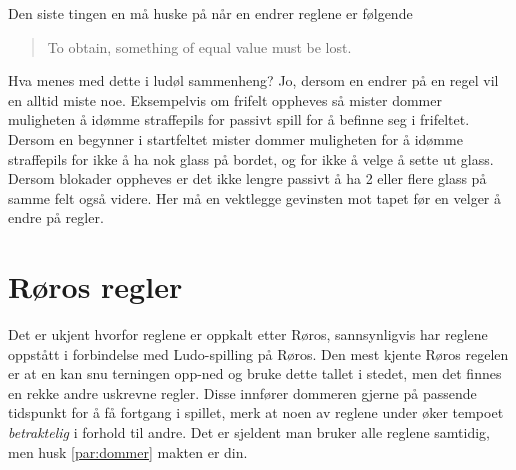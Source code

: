 \documentclass[10pt,a4paper,norsk,openany]{book}
\begin{document}
Den siste tingen en må huske på når en endrer reglene er følgende
%
\begin{quote}
  \centering
  To obtain, something of equal value must be lost.
\end{quote}
%
Hva menes med dette i ludøl sammenheng? Jo, dersom en endrer på en regel vil en
alltid miste noe. Eksempelvis om frifelt oppheves så mister dommer muligheten å
idømme straffepils for passivt spill for å befinne seg i frifeltet. Dersom en
begynner i startfeltet mister dommer muligheten for å idømme straffepils for
ikke å ha nok glass på bordet, og for ikke å velge å sette ut glass. Dersom
blokader oppheves er det ikke lengre passivt å ha 2 eller flere glass på samme
felt også videre. Her må en vektlegge gevinsten mot tapet før en velger å endre
på regler.

\newpage

\section{Røros regler}

Det er ukjent hvorfor reglene er oppkalt etter Røros, sannsynligvis har reglene
oppstått i forbindelse med Ludo-spilling på Røros. Den mest kjente Røros regelen
er at en kan snu terningen opp-ned og bruke dette tallet i stedet, men det
finnes en rekke andre uskrevne regler. Disse innfører dommeren gjerne på
passende tidspunkt for å få fortgang i spillet, merk at noen av reglene under
øker tempoet \emph{betraktelig} i forhold til andre. Det er sjeldent man bruker
alle reglene samtidig, men husk \cref{par:dommer} makten er din.
\end{document}
